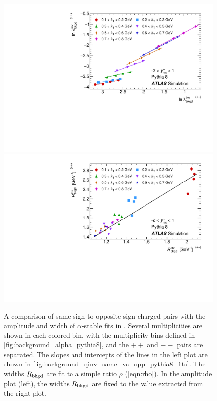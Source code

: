 \begin{figure}[t]
\begin{minipage}[t]{1.0\textwidth}
\centering
\includegraphics[width=.49\linewidth]{qinv_pythia8_backLambda_kt_opp_vs_same.pdf}
\includegraphics[width=.49\linewidth]{qinv_pythia8_backR_kt_opp_vs_same.pdf}
\end{minipage}
\caption{A comparison of same-sign to opposite-sign charged pairs with the amplitude and width of $\alpha$-stable fits in . Several multiplicities are shown in each colored \kt bin, with the multiplicity bins defined in \cref{fig:background_alpha_pythia8}, and the $++$ and $--$ pairs are separated. The slopes and intercepts of the lines in the left plot are shown in \cref{fig:background_qinv_same_vs_opp_pythia8_fits}. The widths $R_{\mathrm{bkgd}}$ are fit to a simple ratio $\rho$ (\cref{eqn:rho}). In the amplitude plot (left), the widths $R_{\mathrm{bkgd}}$ are fixed to the value extracted from the right plot.}
\label{fig:background_qinv_same_vs_opp_pythia8}
\end{figure}

